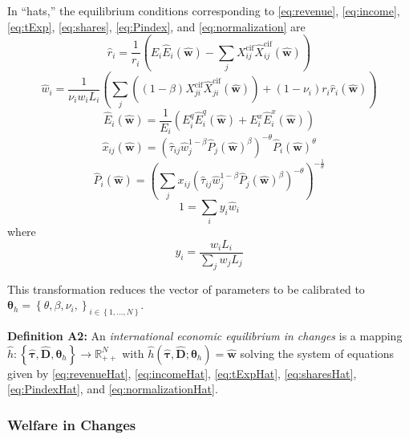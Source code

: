 \documentclass{puthesis}
\begin{document}
In ``hats,'' the equilibrium conditions corresponding to
\ref{eq:revenue}, \ref{eq:income}, \ref{eq:tExp}, \ref{eq:shares},
\ref{eq:Pindex}, and \ref{eq:normalization} are
\begin{equation} \label{eq:revenueHat}
\hat{r}_i = \frac{1}{r_i} \left( E_i \hat{E}_i(\hat{\bm{w}}) - \sum_j X_{ij}^{\text{cif}} \hat{X}_{ij}^{\text{cif}}(\hat{\bm{w}}) \right)
\end{equation} \begin{equation} \label{eq:incomeHat}
\hat{w}_i = \frac{1}{\nu_i w_i L_i} \left( \sum_j \left( (1 - \beta) X_{ji}^{\text{cif}} \hat{X}_{ji}^{\text{cif}}(\hat{\bm{w}}) \right) + (1 - \nu_i) r_i \hat{r}_i(\hat{\bm{w}}) \right)
\end{equation} \begin{equation} \label{eq:tExpHat}
\hat{E}_i(\hat{\bm{w}}) = \frac{1}{E_i} \left( E_i^q \hat{E}_i^q(\hat{\bm{w}}) + E_i^x \hat{E}_i^x(\hat{\bm{w}}) \right)
\end{equation} \begin{equation} \label{eq:sharesHat}
\hat{x}_{ij}(\hat{\bm{w}}) = \left( \hat{\tau}_{ij} \hat{w}_j^{1 - \beta} \hat{P}_j(\hat{\bm{w}})^\beta \right)^{-\theta} \hat{P}_i(\hat{\bm{w}})^{\theta}
\end{equation} \begin{equation} \label{eq:PindexHat}
\hat{P}_i(\hat{\bm{w}}) = \left( \sum_j x_{ij} \left( \hat{\tau}_{ij} \hat{w}_j^{1 - \beta} \hat{P}_j(\hat{\bm{w}})^\beta \right)^{-\theta} \right)^{-\frac{1}{\theta}}
\end{equation} \begin{equation} \label{eq:normalizationHat}
1 = \sum_i y_i \hat{w}_i
\end{equation} where \[
y_i = \frac{w_i L_i}{\sum_j w_j L_j}
\]

This transformation reduces the vector of parameters to be calibrated to
\(\bm{\theta}_h = \left\{\theta, \beta, \nu_i, \right\}_{i \in \left\{ 1, ..., N \right\}}\).

\textbf{Definition A2:} An \emph{international economic equilibrium in
changes} is a mapping
\(\hat{h} : \left\{ \hat{\bm{\tau}}, \hat{\bm{D}}, \bm{\theta}_h \right\} \rightarrow \mathbb{R}_{++}^N\)
with
\(\hat{h}(\hat{\bm{\tau}}, \hat{\bm{D}}; \bm{\theta}_h) = \hat{\bm{w}}\)
solving the system of equations given by \ref{eq:revenueHat},
\ref{eq:incomeHat}, \ref{eq:tExpHat}, \ref{eq:sharesHat},
\ref{eq:PindexHat}, and \ref{eq:normalizationHat}.

\subsubsection{Welfare in Changes}
\end{document}
